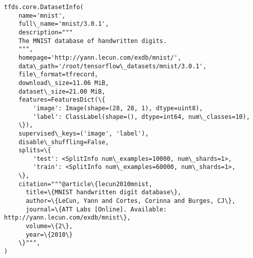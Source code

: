 \documentclass[11pt]{article}
\begin{document}
    \begin{Verbatim}[commandchars=\\\{\}]
tfds.core.DatasetInfo(
    name='mnist',
    full\_name='mnist/3.0.1',
    description="""
    The MNIST database of handwritten digits.
    """,
    homepage='http://yann.lecun.com/exdb/mnist/',
    data\_path='/root/tensorflow\_datasets/mnist/3.0.1',
    file\_format=tfrecord,
    download\_size=11.06 MiB,
    dataset\_size=21.00 MiB,
    features=FeaturesDict(\{
        'image': Image(shape=(28, 28, 1), dtype=uint8),
        'label': ClassLabel(shape=(), dtype=int64, num\_classes=10),
    \}),
    supervised\_keys=('image', 'label'),
    disable\_shuffling=False,
    splits=\{
        'test': <SplitInfo num\_examples=10000, num\_shards=1>,
        'train': <SplitInfo num\_examples=60000, num\_shards=1>,
    \},
    citation="""@article\{lecun2010mnist,
      title=\{MNIST handwritten digit database\},
      author=\{LeCun, Yann and Cortes, Corinna and Burges, CJ\},
      journal=\{ATT Labs [Online]. Available: http://yann.lecun.com/exdb/mnist\},
      volume=\{2\},
      year=\{2010\}
    \}""",
)
    \end{Verbatim}
\end{document}
